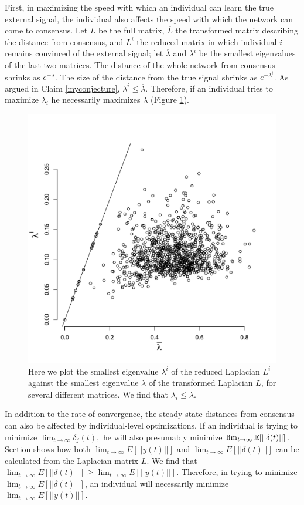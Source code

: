\documentclass{article}
\begin{document}
First, in maximizing the speed with which an individual can learn the true external signal, the individual also affects the speed with which the network can come to consensus.  Let $L$ be the full matrix, $\overline{L}$ the transformed matrix describing the distance from consensus, and $L^i$ the reduced matrix in which individual $i$ remains convinced of the external signal; let $\overline{\lambda}$ and $\lambda^i$ be the smallest eigenvalues of the last two matrices.  The distance of the whole network from consensus shrinks as $e^{-\overline{\lambda}}$.  The size of the distance from the true signal shrinks as $e^{-\lambda^i}$.  As argued in Claim \ref{myconjecture}, $\lambda^i\leq\overline{\lambda}$.  Therefore, if an individual tries to maximize $\lambda_i$ he necessarily maximizes $\overline{\lambda}$ (Figure \ref{eigenvalue_comparison}).
\begin{figure}
\begin{center}
\includegraphics[width=.5\textwidth]{eigenvalue_comparison.pdf}
\end{center}
\caption{\label{eigenvalue_comparison} Here we plot the smallest eigenvalue $\lambda^i$ of the reduced Laplacian $L^i$ against the smallest eigenvalue $\overline{\lambda}$ of the transformed Laplacian $\overline{L}$, for several different matrices.  We find that $\lambda_i\leq \overline{\lambda}$.}
\end{figure}

In addition to the rate of convergence, the steady state distances from consensus can also be affected by individual-level optimizations.  If an individual is trying to minimize $\lim_{t\to\infty}\delta_j(t),$ he will also presumably minimize $\lim_{t\to\infty}{\mathbb{E}}[||\delta(t)||]$.  Section  shows how both $\lim_{t\to\infty}E[||y(t)||]$ and $\lim_{t\to\infty}E[||\delta(t)||]$ can be calculated from the Laplacian matrix $L$.  We find that $\lim_{t\to\infty}E[||\delta(t)||]\geq \lim_{t\to\infty}E[||y(t)||]$.  Therefore, in trying to minimize $\lim_{t\to\infty}E[||\delta(t)||]$, an individual will necessarily minimize $\lim_{t\to\infty}E[||y(t)||]$.
\end{document}
